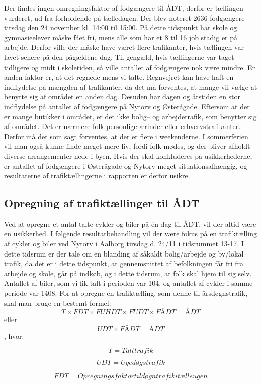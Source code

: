 Der findes ingen omregningsfaktor af fodgængere til ÅDT, derfor er tællingen vurderet, ud fra forholdende på tælledagen. Der blev noteret 2636 fodgængere tirsdag den 24 november kl. 14:00 til 15:00. På dette tidspunkt har skole og gymnasieelever måske fået fri, mens alle som har et 8 til 16 job stadig er på arbejde. Derfor ville der måske have været flere trafikanter, hvis tællingen var lavet senere på den pågældene dag. Til gengæld, hvis tællingerne var taget tidligere og midt i skoletiden, så ville antallet af fodgængere nok være mindre. En anden faktor er, at det regnede mens vi talte. Regnvejret kan have haft en indflydelse på mængden af trafikanter, da det må forventes, at mange vil vælge at benytte sig af området en anden dag. Desuden har dagen og årstiden en stor indflydelse på antallet af fodgængere på Nytorv og Østerågade. Eftersom at der er mange butikker i området, er det ikke bolig– og arbejdetrafik, som benytter sig af området. Det er nærmere folk personlige ærinder eller erhvervstrafikanter. Derfor må det som sagt forventes, at der er flere i weekenderne. I sommerferien vil man også kunne finde meget mere liv, fordi folk mødes, og der bliver afholdt diverse arrangementer nede i byen. Hvis der skal konkluderes på usikkerhederne, er antallet af fodgængere i Østerågade og Nytorv meget situationsafhængig, og resultaterne af trafiktællingerne i rapporten er derfor usikre.
\subsection{Opregning af trafiktællinger til ÅDT}
\label{sub:opregning}
Ved at opregne et antal talte cykler og biler på én dag til ÅDT, vil der altid være en usikkerhed.
I følgende resultatbehandling vil der være fokus på en trafiktælling af cykler og biler ved Nytorv i Aalborg tirsdag d. 24/11 i tidsrummet 13-17. I dette tidsrum er der tale om en blanding af såkaldt bolig/arbejde og by/lokal trafik, da det er i dette tidspunkt, at gennemsnittet af befolkningen får fri fra arbejde og skole, går på indkøb, og i dette tidsrum, at folk skal hjem til sig selv.
Antallet af biler, som vi fik talt i perioden var 104, og antallet af cykler i samme periode var 1408.
For at opregne en trafiktælling, som denne til årsdøgnstrafik, skal man bruge en bestemt formel:
$$ T \times FDT \times FUHDT \times FUDT \times FÅDT = ÅDT $$ eller $$ UDT \times FÅDT = ÅDT$$ , hvor:

$$T = Talt trafik$$

$$UDT = Ugedøgstrafik$$

$$FDT = Opregningsfaktor til døgntrafik i tælleugen$$

